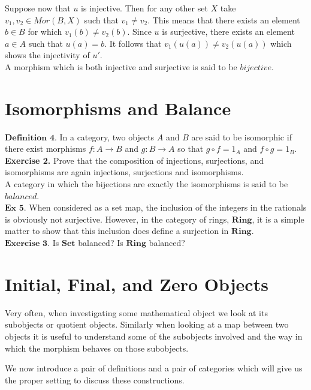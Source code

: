 \documentclass{article}
\theoremstyle{problemstyle}
\begin{document}
Suppose now that $u$ is injective. Then for any other set $X$ take $v_1,v_2 \in Mor(B,X)$ such that $v_1 \neq v_2$. This means that there exists an element  $b \in B$ for which $v_1(b) \neq v_2(b)$. Since $u$ is surjective, there exists an element $a \in A$ such that $u(a) = b$. It follows that $v_1(u(a)) \neq v_2(u(a))$ which shows the injectivity of $u'$.\\ 

A morphism which is both injective and surjective is said to be $bijective$.

\section{Isomorphisms and Balance}

$\textbf{Definition 4.}$ In a category, two objects $A$ and $B$ are said to be isomorphic if there exist morphisms $f:A \rightarrow B$ and $g:B \rightarrow A$ so that $g\circ f = 1_A$ and $f \circ g = 1_B$.\\

\textbf{Exercise 2.} Prove that the composition of injections, surjections, and isomorphisms are again injections, surjections and isomorphisms.\\ 

A category in which the bijections are exactly the isomorphisms is said to be $balanced$.\\ 

$\textbf{Ex 5.}$ When considered as a set map, the inclusion of the integers in the rationals is obviously not surjective. However, in the category of rings, $\textbf{Ring}$, it is a simple matter to show that this inclusion does define a surjection in $\textbf{Ring}$.\\

$\textbf{Exercise 3.}$ Is $\textbf{Set}$ balanced? Is $\textbf{Ring}$ balanced?\\

\section{Initial, Final, and Zero Objects}

Very often, when investigating some mathematical object we look at its subobjects or quotient objects. Similarly when looking at a map between two objects it is useful to understand some of the subobjects involved and the way in which the morphism behaves on those subobjects. 

We now introduce a pair of definitions and a pair of categories which will give us the proper setting to discuss these constructions.\\ 
\end{document}
